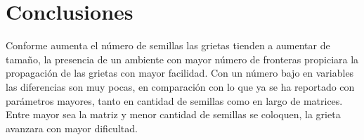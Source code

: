 \documentclass{article}
\begin{document}
\section{Conclusiones}
Conforme aumenta el número de semillas las grietas tienden a aumentar de tamaño, la presencia de un ambiente con mayor número de fronteras propiciara la propagación de las grietas con mayor facilidad.
Con un número bajo en variables las diferencias son muy pocas, en comparación con lo que ya se ha reportado con parámetros mayores, tanto en cantidad de semillas como en largo de matrices.
Entre mayor sea la matriz y menor cantidad de semillas se coloquen, la grieta avanzara con mayor dificultad.





\end{document}
